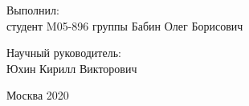 %
\vspace{0pt plus1fill} %
\begin{flushleft}
Выполнил:\\
студент M05-896 группы\hspace{1cm} \underline{\hspace{3cm}} \hspace{0.5cm}
Бабин Олег Борисович
\end{flushleft}
\vspace{0pt plus1fill}
\begin{flushleft}
Научный руководитель:\\
\hspace{6.5cm}\underline{\hspace{3cm}} \hspace{0.5cm}
Юхин Кирилл Викторович
\end{flushleft}
%
\vspace{0pt plus4fill} %
\begin{center}%
Москва 2020
\end{center}%
\newpage
